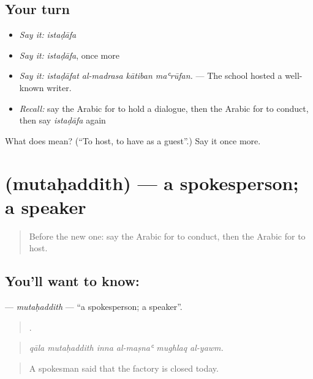 \subsection*{Your turn}
\begin{itemize}
\raggedright
  \item \emph{Say it:} \emph{istaḍāfa}
  \item \emph{Say it:} \emph{istaḍāfa}, once more
  \item \emph{Say it:} \emph{istaḍāfat al-madrasa kātiban maʿrūfan.} — The school hosted a well-known writer.
  \item \emph{Recall:} say the Arabic for to hold a dialogue, then the Arabic for to conduct, then say \emph{istaḍāfa} again
\end{itemize}

\begin{tcolorbox}[breakable,colback=teal!4,colframe=teal!35!black,title={Before you move on}]
What does  mean? (\textquotedblleft{}To host, to have as a guest\textquotedblright{}.) Say it once more.
\end{tcolorbox}
\section[\texorpdfstring{\ar{متحدث} (mutaḥaddith)}{متحدث (mutaḥaddith)}]{ (mutaḥaddith) — a spokesperson; a speaker}

\label{lesson:AR-C302-mutahaddith}



\begin{quote}
Before the new one: say the Arabic for to conduct, then the Arabic for to host.
\end{quote}

\subsection*{You'll want to know: }
\textbf{} — \emph{mutaḥaddith} — \textquotedblleft{}a spokesperson; a speaker\textquotedblright{}.

\begin{quote}
     .
\end{quote}

\begin{quote}
\emph{qāla mutaḥaddith inna al-maṣnaʿ mughlaq al-yawm.}
\end{quote}

\begin{quote}
A spokesman said that the factory is closed today.
\end{quote}

